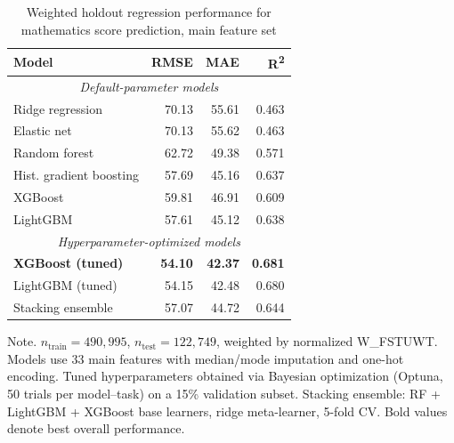 \begin{table}[!t]
\centering
\caption{Weighted holdout regression performance for mathematics score prediction, main feature set\label{tab:regression}}
\begin{tabular}{@{}lrrr@{}}
\toprule
\textbf{Model} & \textbf{RMSE} & \textbf{MAE} & \textbf{R\textsuperscript{2}} \\
\midrule
\multicolumn{4}{c}{\textit{Default-parameter models}} \\
\midrule
  Ridge regression & 70.13 & 55.61 & 0.463 \\
  Elastic net & 70.13 & 55.62 & 0.463 \\
  Random forest & 62.72 & 49.38 & 0.571 \\
  Hist. gradient boosting & 57.69 & 45.16 & 0.637 \\
  XGBoost & 59.81 & 46.91 & 0.609 \\
  LightGBM & 57.61 & 45.12 & 0.638 \\
\midrule
\multicolumn{4}{c}{\textit{Hyperparameter-optimized models}} \\
\midrule
  \textbf{XGBoost (tuned)} & \textbf{54.10} & \textbf{42.37} & \textbf{0.681} \\
  LightGBM (tuned) & 54.15 & 42.48 & 0.680 \\
  Stacking ensemble & 57.07 & 44.72 & 0.644 \\
\bottomrule
\end{tabular}
\begin{tablenotes}
\item Note. $n_\text{train} = 490{,}995$, $n_\text{test} = 122{,}749$, weighted by normalized W\_FSTUWT. Models use 33 main features with median/mode imputation and one-hot encoding. Tuned hyperparameters obtained via Bayesian optimization (Optuna, 50 trials per model--task) on a 15\% validation subset. Stacking ensemble: RF + LightGBM + XGBoost base learners, ridge meta-learner, 5-fold CV. Bold values denote best overall performance.
\end{tablenotes}
\end{table}
